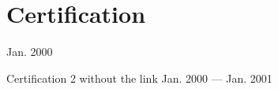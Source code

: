 \section{Certification}

    {Jan. 2000}

\resource%
    {Certification 2 without the link}
    {Jan. 2000 --- Jan. 2001}
